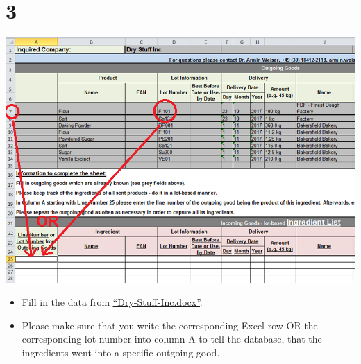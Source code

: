 \documentclass[10pt]{beamer}
\begin{document}
\section{3}
\begin{frame}
	\begin{center}
			\includegraphics[height=0.6\textheight]{3.png}
	\end{center}
	\begin{itemize}
		\item Fill in the data from \textcolor{blue}{\underline{\href{https://github.com/SiLeBAT/BfROpenLabResources/raw/master/GitHubPages/documents/FCL\_Tracing\_backward\_template/Dry-Stuff-Inc.docx}{``Dry-Stuff-Inc.docx''}}}.
		\item Please make sure that you write the corresponding Excel row OR the corresponding lot number into column A to tell the database, that the ingredients went into a specific outgoing good.
	\end{itemize}
\end{frame}
\end{document}
